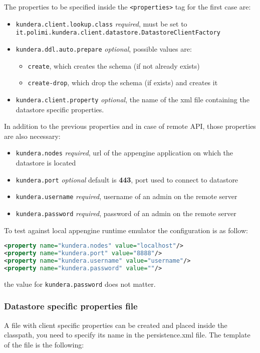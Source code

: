 \newparagraph The properties to be specified inside the \texttt{<properties>} tag for the first case are:
\begin{itemize}
\item \texttt{kundera.client.lookup.class} \textit{required}, must be set to \\ \texttt{it.polimi.kundera.client.datastore.DatastoreClientFactory}
\item \texttt{kundera.ddl.auto.prepare} \textit{optional}, possible values are:
\begin{itemize}
\item \texttt{create}, which creates the schema (if not already exists)
\item \texttt{create-drop}, which drop the schema (if exists) and creates it
\end{itemize}
\item \texttt{kundera.client.property} \textit{optional}, the name of the xml file containing the datastore specific properties.
\end{itemize}

\noindent In addition to the previous properties and in case of remote API, those properties are also necessary:
\begin{itemize}
\item \texttt{kundera.nodes} \textit{required}, url of the appengine application on which the datastore is located
\item \texttt{kundera.port} \textit{optional} default is \textbf{443}, port used to connect to datastore
\item \texttt{kundera.username} \textit{required}, username of an admin on the remote server
\item \texttt{kundera.password} \textit{required}, password of an admin on the remote server
\end{itemize}

\noindent To test against local appengine runtime emulator the configuration is as follow:

\begin{lstlisting}[language=XML, caption=GAE Datastore emulator configuration]
<property name="kundera.nodes" value="localhost"/>
<property name="kundera.port" value="8888"/>
<property name="kundera.username" value="username"/>
<property name="kundera.password" value=""/>
\end{lstlisting}

\noindent the value for \texttt{kundera.password} does not matter.

\subsubsection{Datastore specific properties file}
A file with client specific properties can be created and placed inside the classpath, you need to specify its name in the persistence.xml file.
The template of the file is the following:

